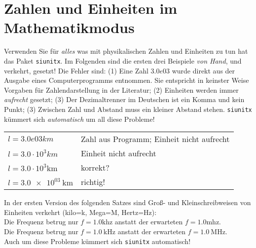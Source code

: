 \documentclass[11pt,a4paper]{scrartcl}
\begin{document}
\section{Zahlen und Einheiten im Mathematikmodus}
%
Verwenden Sie für \emph{alles} was mit physikalischen Zahlen und Einheiten
zu tun hat das Paket \texttt{siunitx}. Im Folgenden sind
die ersten drei Beispiele \emph{von Hand}, und verkehrt, gesetzt!
Die Fehler sind: (1) Eine Zahl $3.0e03$ wurde direkt aus der Ausgabe eines Computerprogramms entnommen. Sie entspricht in keinster Weise
Vorgaben für Zahlendarstellung in der Literatur; (2) Einheiten werden
immer \emph{aufrecht} gesetzt; (3) Der Dezimaltrenner im Deutschen ist
ein Komma und kein Punkt; (3) Zwischen Zahl und Abstand muss ein kleiner
Abstand stehen. \texttt{siunitx} kümmert sich \emph{automatisch} um all diese Probleme!
%
\begin{center}
  \begin{tabular}{ll}
    $l=3.0e03 km$ &  Zahl aus Programm; Einheit nicht aufrecht \\
    $l=3.0\cdot 10^{3} km$ & Einheit nicht aufrecht \\
    $l=3.0\cdot 10^{3} \mathrm{km}$ & korrekt?\\
    $l=\SI{3.0e03}{\kilo\meter}$ & richtig! \\
  \end{tabular}
\end{center}
In der ersten Version des folgenden Satzes sind Groß- und Kleinschreibweisen von Einheiten verkehrt (kilo=k, Mega=M, Hertz=Hz): \\
Die Frequenz betrug nur $f=1.0 \mathrm{khz}$ anstatt der
erwarteten $f=1.0 \mathrm{mhz}$. \\
Die Frequenz betrug nur $f=\SI{1.0}{\kilo\hertz}$ anstatt der
erwarteten $f=\SI{1,0}{\mega\hertz}$. \\
Auch um diese Probleme kümmert sich \texttt{siunitx} automatisch!
%
\end{document}
